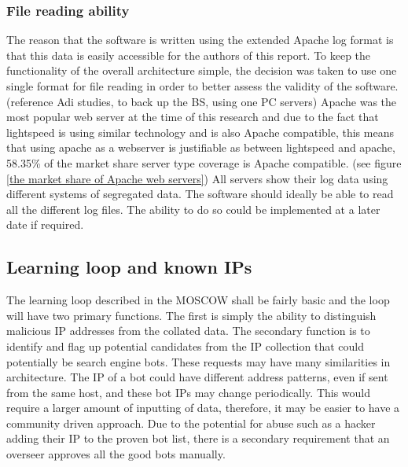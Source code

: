 \subsubsection*{File reading ability}
The reason that the software is written using the extended Apache log format is that this data is easily accessible for the authors of this report. To keep the functionality of the overall architecture simple, the decision was taken to use one single format for file reading in order to better assess the validity of the software. (reference Adi studies, to back up the BS, using one PC servers) Apache was the most popular web server at the time of this research and due to the fact that lightspeed is using similar technology and is also Apache compatible, this means that using apache as a webserver is justifiable as between lightspeed and apache, 58.35\% of the market share server type coverage is Apache compatible. (see figure \ref{the market share of Apache web servers})
All servers show their log data using different systems of segregated data. The software should ideally be able to read all the different log files. The ability to do so could be implemented at a later date if required. 

\subsection*{Learning loop and known IPs} \label{Learning loop and known IP's}

The learning loop described in the MOSCOW shall be fairly basic and the loop will have two primary functions. The first is simply the ability to distinguish malicious IP addresses from the collated data. The secondary function is to identify and flag up potential candidates from the IP collection that could potentially be search engine bots. These requests may have many similarities in architecture. The IP of a bot could have different address patterns, even if sent from the same host, and these bot IPs may change periodically. This would require a larger amount of inputting of data, therefore, it may be easier to have a community driven approach. Due to the potential for abuse such as a hacker adding their IP to the proven bot list, there is a secondary requirement that an overseer approves all the good bots manually.

